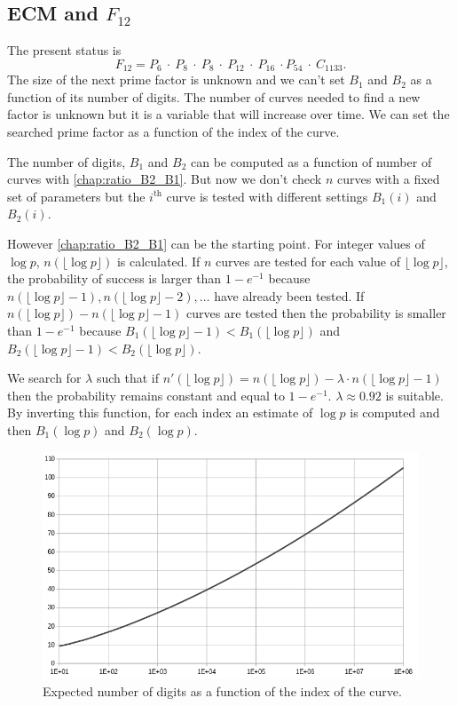 \documentclass[a4paper, 11pt, pdftex]{report}
\theoremstyle{plain}
\theoremstyle{definition}
\begin{document}
\subsection{ECM and $F_{12}$}

The present status is
$$F_{12} = P_6 \:\cdot\: P_8 \:\cdot\: P_8 \:\cdot\: P_{12} \:\cdot\: P_{16} \:\cdot P_{54}
\:\cdot\: C_{1133}.$$
The size of the next prime factor is unknown and we can't set $B_1$ and $B_2$ as a function
of its number of digits. The number of curves needed to find a new factor is unknown but it
is a variable that will increase over time. We can set the searched prime factor as a function
of the index of the curve.

The number of digits, $B_1$ and $B_2$ can be computed as a function of number of curves
with \autoref{chap:ratio_B2_B1}. But now we don't check $n$ curves with a fixed set of
parameters but the $i^\text{th}$ curve is tested with different settings
$B_1(i)$ and $B_2(i)$.

However \autoref{chap:ratio_B2_B1} can be the starting point. For integer values of $\log p$,
$n(\lfloor\log p\rfloor)$ is calculated. If $n$ curves are tested for each value of
$\lfloor\log p\rfloor$, the probability of success is larger than $1 - e^{-1}$ because
$n(\lfloor\log p\rfloor - 1), n(\lfloor\log p\rfloor - 2), \ldots$ have already been tested.
If $n(\lfloor\log p\rfloor) - n(\lfloor\log p\rfloor - 1)$ curves are tested then
the probability is smaller than $1 - e^{-1}$ because
$B_1(\lfloor\log p\rfloor - 1) < B_1(\lfloor\log p\rfloor)$ and
$B_2(\lfloor\log p\rfloor - 1) < B_2(\lfloor\log p\rfloor)$.

We search for $\lambda$ such that if
$n'(\lfloor\log p\rfloor) = n(\lfloor\log p\rfloor) - \lambda \cdot n(\lfloor\log p\rfloor - 1)$
then the probability remains constant and equal to $1 - e^{-1}$. $\lambda \approx 0.92$ is
suitable. By inverting this function, for each index an estimate of $\log p$ is computed and
then $B_1(\log p)$ and $B_2(\log p)$.


\begin{figure}[!ht]
	\vspace*{1.0cm}
	\centering
	\includegraphics[width=15.5cm, angle=0]{img/digits_n.png}
	\caption{\label{fig:dgt_n} Expected number of digits as a function of the index of the curve.}
	\vspace*{1.0cm}
\end{figure}
\end{document}
